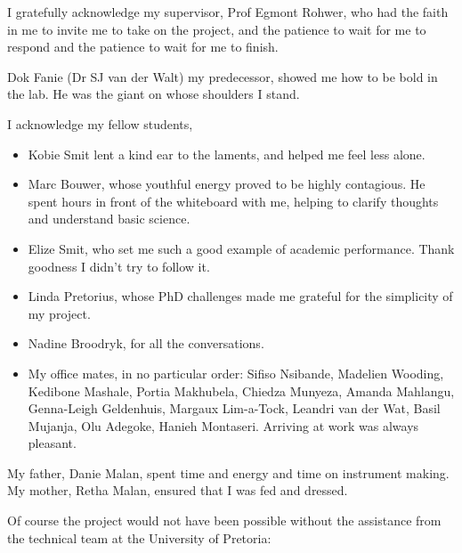 \documentclass[
11pt, %
english, %
singlespacing, %
headsepline, %
]{MastersDoctoralThesis} %
\begin{document}

\begin{acknowledgements}
\addchaptertocentry{\acknowledgementname} %

I gratefully acknowledge my supervisor, Prof Egmont Rohwer, who had the faith in
me to invite me to take on the project, and the patience to wait for me to
respond and the patience to wait for me to finish. 

Dok Fanie (Dr SJ van der Walt) my predecessor, showed me how to be bold in the
lab. He was the giant on whose shoulders I stand.

I acknowledge my fellow students,
\begin{itemize} 
  
\item Kobie Smit lent a kind ear to the laments, and helped me feel less alone.

\item Marc Bouwer, whose youthful energy proved to be highly contagious. He
spent hours in front of the whiteboard with me, helping to clarify thoughts and
understand basic science.

\item Elize Smit, who set me such a good example of academic performance. Thank
goodness I didn't try to follow it.
 
\item Linda Pretorius, whose PhD challenges made me grateful for the simplicity
of my project.

\item Nadine Broodryk, for all the conversations.

\item My office mates, in no particular order: Sifiso Nsibande, Madelien
Wooding, Kedibone Mashale, Portia Makhubela, Chiedza Munyeza, Amanda Mahlangu,
Genna-Leigh Geldenhuis, Margaux Lim-a-Tock, Leandri van der Wat, Basil Mujanja,
Olu Adegoke, Hanieh Montaseri. Arriving at work was always pleasant.

\end{itemize}

My father, Danie Malan, spent time and energy and time on instrument making. My
mother, Retha Malan, ensured that I was fed and dressed. 

Of course the project would not have been possible without the assistance from
the technical team at the University of Pretoria:


\end{acknowledgements}
\end{document}
